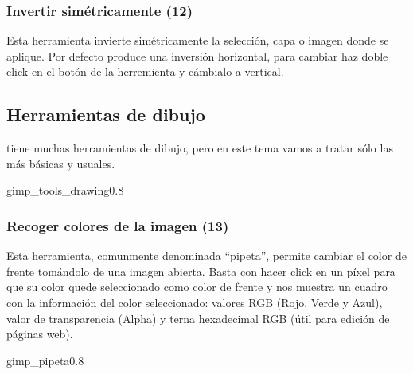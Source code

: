 \subsubsection{Invertir simétricamente (12)}

Esta herramienta  invierte simétricamente la selección,  capa o imagen
donde se aplique.  Por defecto produce una  inversión horizontal, para
cambiar haz  doble click en  el botón de  la herremienta y  cámbialo a
{\sf vertical}.

\subsection{Herramientas de dibujo}

\gimp tiene muchas  herramientas de dibujo, pero en este  tema vamos a
tratar sólo las más básicas y usuales.

\begin{figura}{gimp_tools_drawing}{0.8}
\caption{Herramientas básicas de dibujo}
\end{figura}

\subsubsection{Recoger colores de la imagen (13)}

Esta herramienta, comunmente denominada ``pipeta'', permite cambiar el
color de frente tomándolo de una imagen abierta. Basta con hacer click
en un píxel para que su  color quede seleccionado como color de frente
y nos  muestra un  cuadro con la  información del  color seleccionado:
valores  RGB  ({\sf  Rojo},  {\sf  Verde}  y  {\sf  Azul}),  valor  de
transparencia ({\sf Alpha}) y terna hexadecimal RGB (útil para edición
de páginas web).

\begin{figura}{gimp_pipeta}{0.8}
\caption{Cuadros de información de color seleccionado con la pipeta}
\end{figura}




